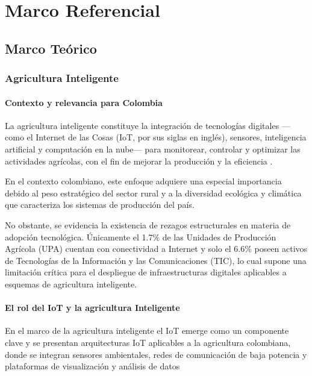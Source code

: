 
\chapter{Marco Referencial}

\section{Marco Teórico}

\subsection{Agricultura Inteligente}

\subsubsection{Contexto y relevancia para Colombia}

La agricultura inteligente constituye la integración  de  tecnologías  digitales
—como el Internet de las Cosas  (IoT,  por  sus  siglas  en  inglés),  sensores,
inteligencia artificial y computación en la nube— para monitorear,  controlar  y
optimizar las actividades agrícolas, con el fin de mejorar la  producción  y  la
eficiencia \parencite[]{de2022survey}.

En el contexto colombiano, este enfoque adquiere una especial importancia debido
al peso estratégico del sector rural y a la diversidad ecológica y climática que
caracteriza los sistemas de producción del país.

No obstante, se evidencia la existencia de rezagos estructurales en  materia  de
adopción tecnológica. Únicamente el 1.7\% de las Unidades de Producción Agrícola
(UPA) cuentan con conectividad a Internet y solo  el  6.6\%  poseen  activos  de
Tecnologías de la Información y las Comunicaciones (TIC),  lo  cual  supone  una
limitación  crítica   para   el   despliegue   de   infraestructuras   digitales
\parencite[]{alvarez2022colombian}  aplicables   a   esquemas   de   agricultura
inteligente.

\subsubsection{El rol del IoT y la agricultura Inteligente} En el  marco  de  la
agricultura inteligente el IoT emerge como un componente clave  y  se  presentan
arquitecturas IoT aplicables a la  agricultura  colombiana,  donde  se  integran
sensores ambientales, redes de comunicación de baja potencia  y  plataformas  de
visualización y análisis de datos \parencite[]{chen2018cognitive}

